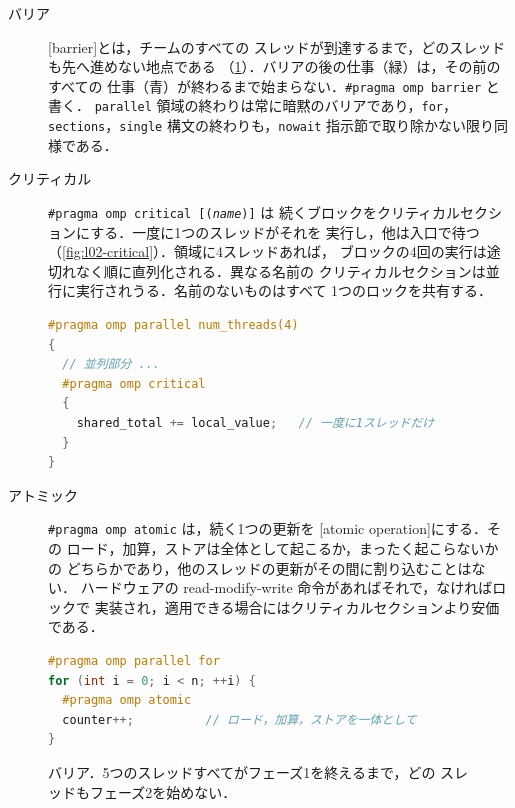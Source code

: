\documentclass[../main.tex]{subfiles}
\begin{document}
\begin{description}
  \item[バリア]  [barrier]とは，チームのすべての
    スレッドが到達するまで，どのスレッドも先へ進めない地点である
    （\cref{fig:l02-barrier}）．バリアの後の仕事（緑）は，その前のすべての
    仕事（青）が終わるまで始まらない．\texttt{\#pragma omp barrier} と書く．
    \texttt{parallel} 領域の終わりは常に暗黙のバリアであり，\texttt{for}，
    \texttt{sections}，\texttt{single} 構文の終わりも，\texttt{nowait}
    指示節で取り除かない限り同様である．
  \item[クリティカル]  \texttt{\#pragma omp critical [(\textit{name})]} は
    続くブロックをクリティカルセクションにする．一度に1つのスレッドがそれを
    実行し，他は入口で待つ（\cref{fig:l02-critical}）．領域に4スレッドあれば，
    ブロックの4回の実行は途切れなく順に直列化される．異なる名前の
    クリティカルセクションは並行に実行されうる．名前のないものはすべて
    1つのロックを共有する．
\begin{lstlisting}[language=C++, numbers=none]
#pragma omp parallel num_threads(4)
{
  // 並列部分 ...
  #pragma omp critical
  {
    shared_total += local_value;   // 一度に1スレッドだけ
  }
}
\end{lstlisting}
  \item[アトミック]  \texttt{\#pragma omp atomic} は，続く1つの更新を
    [atomic operation]にする．その
    ロード，加算，ストアは全体として起こるか，まったく起こらないかの
    どちらかであり，他のスレッドの更新がその間に割り込むことはない．
    ハードウェアの read-modify-write 命令があればそれで，なければロックで
    実装され，適用できる場合にはクリティカルセクションより安価である．
\begin{lstlisting}[language=C++, numbers=none]
#pragma omp parallel for
for (int i = 0; i < n; ++i) {
  #pragma omp atomic
  counter++;          // ロード，加算，ストアを一体として
}
\end{lstlisting}
\end{description}

\begin{figure}[tb]
  \centering
  
  \caption{バリア．5つのスレッドすべてがフェーズ1を終えるまで，どの
    スレッドもフェーズ2を始めない．}
  \label{fig:l02-barrier}
\end{figure}
\end{document}
